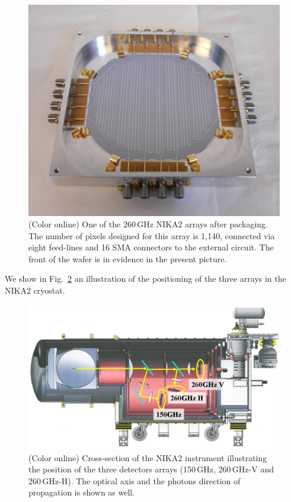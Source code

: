 \documentclass[]{aa} %
\begin{document}
\begin{figure}[h]
   \centering
    \includegraphics[width=.95\linewidth]{1mm_array.jpg}
      \caption{(Color online) One of the 260\,GHz NIKA2 arrays after packaging. The number of pixels designed for this array is 1,140, connected via eight feed-lines and 16 SMA connectors to the external circuit. The front of the wafer is in evidence in the present picture.}
         \label{Array}
\end{figure}

We show in Fig.~\ref{Cryostat} an illustration of the positioning of the three arrays in the NIKA2 cryostat.
 
\begin{figure}[h]
   \centering
   \includegraphics[width=.95\linewidth]{Fig1_cryo.png}
      \caption{(Color online) Cross-section of the NIKA2 instrument illustrating the position of the three detectors arrays (150\,GHz, 260\,GHz-V and 260\,GHz-H). The optical axis and the photons direction of propagation is shown as well.}
         \label{Cryostat}
\end{figure}
\end{document}
